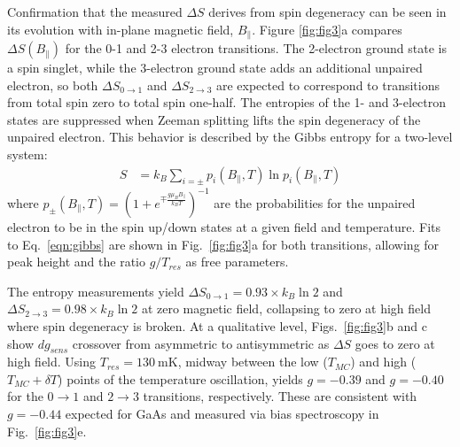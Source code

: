 \documentclass[twocolumn,showpacs,amsmath,amssymb,prl,aps,superscriptaddress]{revtex4-1}
\begin{document}
Confirmation that the measured $\Delta S$ derives from spin degeneracy can be seen in its evolution with in-plane magnetic field, $B_\parallel$. Figure \ref{fig:fig3}a compares $\Delta S(B_\parallel)$ for the 0-1 and 2-3 electron transitions.  The 2-electron ground state is a spin singlet, while the 3-electron ground state adds an additional unpaired electron, so both $\Delta S_{0 \rightarrow 1}$ and $\Delta S_{2 \rightarrow 3}$ are expected to correspond to transitions from total spin zero to total spin one-half.
The entropies of the 1- and 3-electron states are suppressed when Zeeman splitting lifts the spin degeneracy of the unpaired electron. This behavior is described by the Gibbs entropy for a two-level system:
%
\begin{align}
\label{eqn:gibbs}
        S &= k_B \sum_{i=\pm} p_{i}(B_\parallel, T) \ln{ p_{i}(B_\parallel,T) }
\end{align}
%
where $p_{\pm}(B_\parallel, T) = (1+ e^{\mp \frac{g\mu_B B_{\parallel}}{k_B T}})^{-1}$ are the probabilities for the unpaired electron to be in the spin up/down states at a given field and temperature. Fits to Eq.~\ref{eqn:gibbs} are shown in Fig.~\ref{fig:fig3}a for both transitions, allowing for peak height and the ratio $g/T_{res}$ as free parameters.

The entropy measurements yield $\Delta S_{0 \rightarrow 1}=0.93\times k_B \ln{2}$ and $\Delta S_{2 \rightarrow 3}=0.98\times k_B \ln{2}$ at zero magnetic field, collapsing to zero at high field where spin degeneracy is broken.  At a qualitative level, Figs.~\ref{fig:fig3}b and c show $dg_{sens}$ crossover from asymmetric to antisymmetric as $\Delta S$ goes to zero at high field. Using $T_{res} = \SI{130}{\milli\kelvin}$, midway between the low ($T_{MC}$) and high ($T_{MC}+\delta T$) points of the temperature oscillation, yields $g=-0.39$ and $g=-0.40$ for the $0\rightarrow 1$ and $2\rightarrow 3$ transitions, respectively. These are consistent with $g=-0.44$ expected for GaAs and measured via bias spectroscopy in Fig.~\ref{fig:fig3}e.
\end{document}
